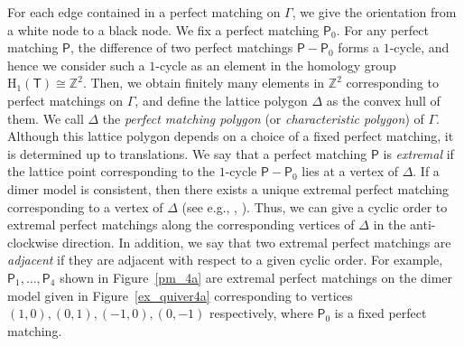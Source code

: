 \documentclass[11pt]{amsart}
\theoremstyle{definition}
\newcommand{\rmH}{\mathrm{H}}
\newcommand{\ZZ}{\mathbb{Z}}
\newcommand{\sfP}{\mathsf{P}}
\newcommand{\sfT}{\mathsf{T}}
\begin{document}
For each edge contained in a perfect matching on $\Gamma$, we give the orientation from a white node to a black node. We fix a perfect matching $\sfP_0$. For any perfect matching $\sfP$, the difference of two perfect matchings $\sfP-\sfP_0$ forms a $1$-cycle, and hence we consider such a $1$-cycle as an element in the homology group $\rmH_1(\sfT)\cong\ZZ^2$. Then, we obtain finitely many elements in $\ZZ^2$ corresponding to perfect matchings on $\Gamma$, and define the lattice polygon $\Delta$ as the convex hull of them. We call $\Delta$ the \emph{perfect matching polygon} (or \emph{characteristic polygon}) of $\Gamma$. Although this lattice polygon depends on a choice of a fixed perfect matching, it is determined up to translations. We say that a perfect matching $\sfP$ is \emph{extremal} if the lattice point corresponding to the $1$-cycle $\sfP-\sfP_0$ lies at a vertex of $\Delta$. If a dimer model is consistent, then there exists a unique extremal perfect matching corresponding to a vertex of $\Delta$ (see e.g., \cite[Corollary~4.27]{Bro}, \cite[Proposition~9.2]{IU2}). Thus, we can give a cyclic order to extremal perfect matchings along the corresponding vertices of $\Delta$ in the anti-clockwise direction. In addition, we say that two extremal perfect matchings are \emph{adjacent} if they are adjacent with respect to a given cyclic order. For example, $\sfP_1,\dots,\sfP_4$ shown in Figure~\ref{pm_4a} are extremal perfect matchings on the dimer model given in Figure~\ref{ex_quiver4a} corresponding to vertices $(1,0),(0,1),(-1,0),(0,-1)$ respectively, where $\sfP_0$ is a fixed perfect matching.
\end{document}
